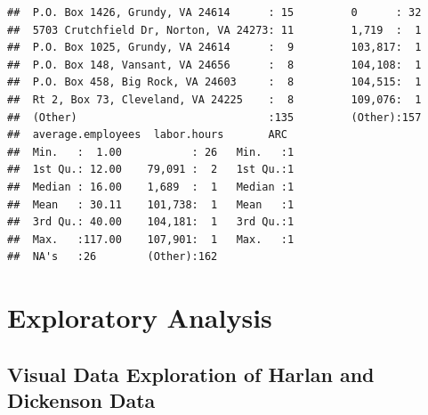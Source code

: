 \documentclass[12pt,]{article}
\begin{document}
\begin{verbatim}
##  P.O. Box 1426, Grundy, VA 24614      : 15         0      : 32     
##  5703 Crutchfield Dr, Norton, VA 24273: 11         1,719  :  1     
##  P.O. Box 1025, Grundy, VA 24614      :  9         103,817:  1     
##  P.O. Box 148, Vansant, VA 24656      :  8         104,108:  1     
##  P.O. Box 458, Big Rock, VA 24603     :  8         104,515:  1     
##  Rt 2, Box 73, Cleveland, VA 24225    :  8         109,076:  1     
##  (Other)                              :135         (Other):157     
##  average.employees  labor.hours       ARC   
##  Min.   :  1.00           : 26   Min.   :1  
##  1st Qu.: 12.00    79,091 :  2   1st Qu.:1  
##  Median : 16.00    1,689  :  1   Median :1  
##  Mean   : 30.11    101,738:  1   Mean   :1  
##  3rd Qu.: 40.00    104,181:  1   3rd Qu.:1  
##  Max.   :117.00    107,901:  1   Max.   :1  
##  NA's   :26        (Other):162
\end{verbatim}

\newpage

\hypertarget{exploratory-analysis}{%
\section{Exploratory Analysis}\label{exploratory-analysis}}

\hypertarget{visual-data-exploration-of-harlan-and-dickenson-data}{%
\subsection{Visual Data Exploration of Harlan and Dickenson
Data}\label{visual-data-exploration-of-harlan-and-dickenson-data}}
\end{document}
